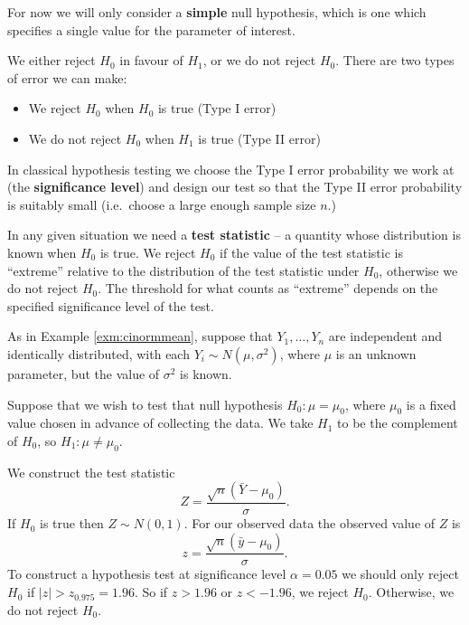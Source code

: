 \documentclass[]{book}
\providecommand{\tightlist}{%
  \setlength{\itemsep}{0pt}\setlength{\parskip}{0pt}}
\theoremstyle{definition}
\theoremstyle{definition}
\theoremstyle{definition}
\theoremstyle{remark}
\let\BeginKnitrBlock\begin \let\EndKnitrBlock\end
\begin{document}
For now we will only consider a \textbf{simple} null hypothesis, which
is one which specifies a single value for the parameter of interest.

We either reject \(H_0\) in favour of \(H_1\), or we do not reject
\(H_0\). There are two types of error we can make:

\begin{itemize}
\tightlist
\item
  We reject \(H_0\) when \(H_0\) is true (Type I error)
\item
  We do not reject \(H_0\) when \(H_1\) is true (Type II error)
\end{itemize}

In classical hypothesis testing we choose the Type I error probability
we work at (the \textbf{significance level}) and design our test so that
the Type II error probability is suitably small (i.e.~choose a large
enough sample size \(n\).)

In any given situation we need a \textbf{test statistic} -- a quantity
whose distribution is known when \(H_0\) is true. We reject \(H_0\) if
the value of the test statistic is ``extreme'' relative to the
distribution of the test statistic under \(H_0\), otherwise we do not
reject \(H_0\). The threshold for what counts as ``extreme'' depends on
the specified significance level of the test.

\BeginKnitrBlock{example}[Normal mean, known variance]
\protect\hypertarget{exm:unnamed-chunk-106}{}{\label{exm:unnamed-chunk-106}
\iffalse (Normal mean, known variance) \fi{} }As in Example
\ref{exm:cinormmean}, suppose that \(Y_1, \ldots, Y_n\) are independent
and identically distributed, with each \(Y_i \sim N(\mu, \sigma^2)\),
where \(\mu\) is an unknown parameter, but the value of \(\sigma^2\) is
known.

Suppose that we wish to test that null hypothesis \(H_0: \mu = \mu_0\),
where \(\mu_0\) is a fixed value chosen in advance of collecting the
data. We take \(H_1\) to be the complement of \(H_0\), so
\(H_1: \mu \not = \mu_0\).

We construct the test statistic
\[Z = \frac{\sqrt{n}(\bar Y - \mu_0)}{\sigma}.\] If \(H_0\) is true then
\(Z \sim N(0, 1)\). For our observed data the observed value of \(Z\) is
\[z =  \frac{\sqrt{n}(\bar y - \mu_0)}{\sigma}.\] To construct a
hypothesis test at significance level \(\alpha = 0.05\) we should only
reject \(H_0\) if \(|z| > z_{0.975} = 1.96\). So if \(z > 1.96\) or
\(z < -1.96\), we reject \(H_0\). Otherwise, we do not reject \(H_0\).
\EndKnitrBlock{example}
\end{document}
